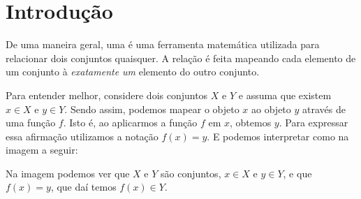 \section{Introdução}

De uma maneira geral, uma  é uma ferramenta matemática utilizada para relacionar dois conjuntos quaisquer. A relação é feita mapeando cada elemento de um conjunto à \emph{exatamente um} elemento do outro conjunto.

Para entender melhor, considere dois conjuntos $X$ e $Y$ e assuma que existem $x \in X$ e $y \in Y$. Sendo assim, podemos mapear o objeto $x$ ao objeto $y$ através de uma função $f$. Isto é, ao aplicarmos a função $f$ em $x$, obtemos $y$. Para expressar essa afirmação utilizamos a notação $f(x) = y$. E podemos interpretar como na imagem a seguir:

\begin{center}
     
\end{center}
Na imagem podemos ver que $X$ e $Y$ são conjuntos, $x \in X$ e $y \in Y$, e que $f(x) = y$, que daí temos $f(x) \in Y$.